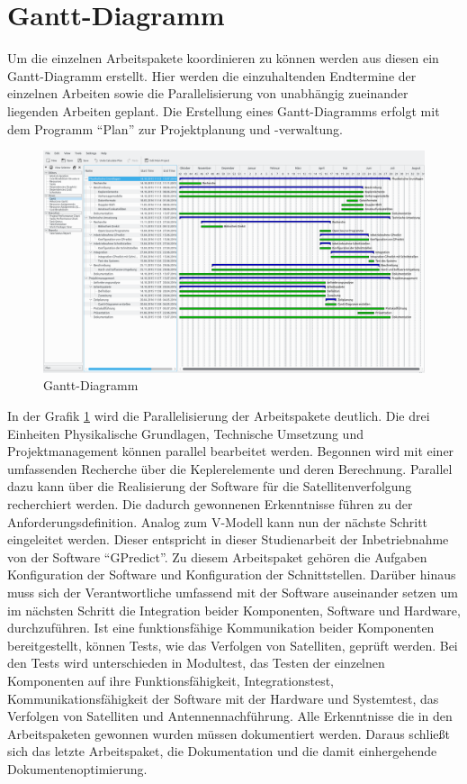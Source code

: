 \section{Gantt-Diagramm}
Um die einzelnen Arbeitspakete koordinieren zu können werden aus diesen ein Gantt-Diagramm 
erstellt. Hier werden die einzuhaltenden Endtermine der einzelnen Arbeiten sowie die 
Parallelisierung von unabhängig zueinander liegenden Arbeiten geplant. Die Erstellung eines Gantt-Diagramms erfolgt mit dem Programm ``Plan'' zur 
Projektplanung und -verwaltung. 
\begin{figure}[h] 
 \centering
\includegraphics[width=1.0\linewidth]{./images/gantt}
\caption{Gantt-Diagramm}
 \label{fig:gantt}
\end{figure}
In der Grafik \ref{fig:gantt} wird die Parallelisierung der Arbeitspakete deutlich. Die drei Einheiten Physikalische Grundlagen, Technische Umsetzung 
und Projektmanagement können parallel bearbeitet werden. Begonnen wird mit einer umfassenden Recherche über die Keplerelemente und deren Berechnung. 
Parallel dazu kann über die  Realisierung der Software für die Satellitenverfolgung recherchiert werden. Die dadurch gewonnenen Erkenntnisse führen 
zu der Anforderungsdefinition. Analog zum V-Modell kann nun der nächste Schritt eingeleitet werden. Dieser entspricht in dieser Studienarbeit der 
Inbetriebnahme von der Software ``GPredict''. Zu diesem Arbeitspaket gehören die Aufgaben Konfiguration der Software und Konfiguration der 
Schnittstellen. Darüber hinaus muss sich der Verantwortliche umfassend mit der Software auseinander setzen um im nächsten Schritt die Integration 
beider Komponenten, Software und Hardware, durchzuführen. Ist eine funktionsfähige Kommunikation beider Komponenten bereitgestellt, können Tests, wie 
das Verfolgen von Satelliten, geprüft werden. Bei den Tests wird unterschieden in Modultest, das Testen der einzelnen Komponenten auf ihre 
Funktionsfähigkeit, Integrationstest, Kommunikationsfähigkeit der Software mit der Hardware und Systemtest, das Verfolgen von Satelliten und 
Antennennachführung. Alle Erkenntnisse die in den Arbeitspaketen gewonnen wurden müssen dokumentiert werden. Daraus schließt sich das letzte 
Arbeitspaket, die Dokumentation und die damit einhergehende Dokumentenoptimierung.